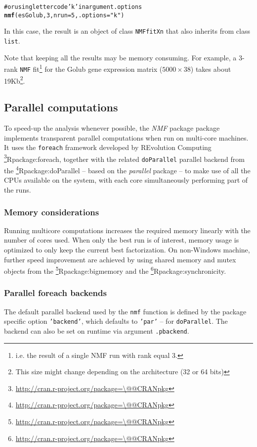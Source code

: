 \documentclass[a4paper]{article}\usepackage{graphicx, color}
\makeatletter
\newcommand{\hlfunctioncall}[1]{\textcolor[rgb]{0.501960784313725,0,0.329411764705882}{\textbf{#1}}}%
\newcommand{\hlstring}[1]{\textcolor[rgb]{0.6,0.6,1}{#1}}%
\newcommand{\hlcomment}[1]{\textcolor[rgb]{0.180392156862745,0.6,0.341176470588235}{#1}}%
\newenvironment{kframe}{%
 \def\at@end@of@kframe{}%
 \ifinner\ifhmode%
  \def\at@end@of@kframe{\end{minipage}}%
  \begin{minipage}{\columnwidth}%
 \fi\fi%
 \def\FrameCommand##1{\hskip\@totalleftmargin \hskip-\fboxsep
 \colorbox{shadecolor}{##1}\hskip-\fboxsep
     \hskip-\linewidth \hskip-\@totalleftmargin \hskip\columnwidth}%
 \MakeFramed {\advance\hsize-\width
   \@totalleftmargin\z@ \linewidth\hsize
   \@setminipage}}%
 {\par\unskip\endMakeFramed%
 \at@end@of@kframe}
\newenvironment{knitrout}{}{} %
\let\code=\texttt
\newcommand{\pkgname}[1]{\textit{#1}\xspace}
\newcommand{\Rpkg}[1]{\pkgname{#1} package\xspace}
\newcommand{\CRANurl}[1]{\url{http://cran.r-project.org/package=#1}}
\def\CRANpkg{\@ifstar\@CRANpkg\@@CRANpkg}
\def\@CRANpkg#1{\href{http://cran.r-project.org/package=#1}{\pkgname{#1}}\footnote{\CRANurl{#1}}}
\def\@@CRANpkg#1{\href{http://cran.r-project.org/package=#1}{\pkgname{#1}} package\footnote{\CRANurl{#1}}}
\def\citeCRANpkg{\@ifstar\@citeCRANpkg\@@citeCRANpkg}
\def\@citeCRANpkg#1{\CRANpkg{#1}\cite*{Rpackage:#1}}
\def\@@citeCRANpkg#1{\CRANpkg{#1}~\cite{Rpackage:#1}}
\newcommand{\nmfpack}{\Rpkg{NMF}}
\renewcommand{\cite}[1]{\parencite{#1}}
\makeatother
\begin{document}
\begin{knitrout}
\color{fgcolor}\begin{kframe}
\begin{alltt}
\hlcomment{# or using letter code \hlstring{'k'} in argument .options}
\hlfunctioncall{nmf}(esGolub, 3, nrun = 5, .options = \hlstring{"k"})
\end{alltt}
\end{kframe}
\end{knitrout}


In this case, the result is an object of class \code{NMFfitXn} that also inherits from class \code{list}.

Note that keeping all the results may be memory consuming. 
For example, a 3-rank \code{NMF} fit\footnote{i.e. the result of a single NMF run with rank equal 3.} for the Golub gene expression matrix ($5000 \times 38$) takes about 19Kb\footnote{This size might change depending on the architecture (32 or 64 bits)}.

\subsection{Parallel computations}\label{multicore}

To speed-up the analysis whenever possible, the \nmfpack package implements transparent parallel computations when run on multi-core machines.
It uses the \code{foreach} framework developed by REvolution Computing
\citeCRANpkg{foreach}, together with the related \code{doParallel} parallel
backend from the \citeCRANpkg{doParallel} -- based on the
\pkgname{parallel} package -- to make use of all the CPUs available on the
system, with each core simultaneously performing part of the runs. 

\subsubsection{Memory considerations}
Running multicore computations increases the required memory linearly
with the number of cores used.
When only the best run is of interest, memory usage is
optimized to only keep the current best factorization.
On non-Windows machine, further speed improvement are achieved by using shared
memory and mutex objects from the \citeCRANpkg{bigmemory} and the 
\citeCRANpkg{synchronicity}.

\subsubsection{Parallel foreach backends}
The default parallel backend used by the \code{nmf} function is defined by the
package specific option \code{'backend'}, which defaults to \code{'par'} -- for
\code{doParallel}.
The backend can also be set on runtime via argument \code{.pbackend}.
\end{document}
